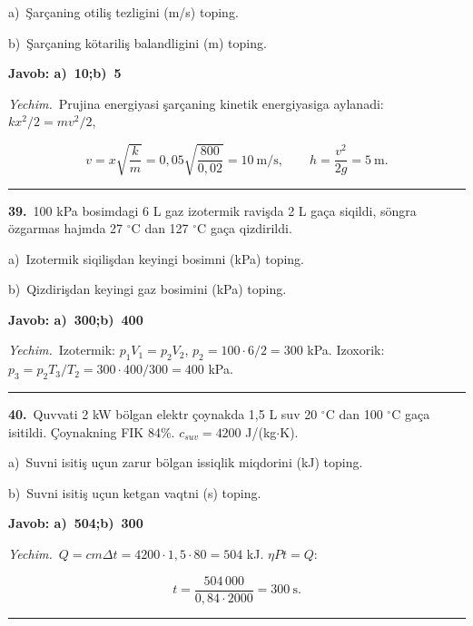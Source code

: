\documentclass[11pt,a4paper]{article}
\begin{document}
\noindent\hspace*{4mm}a)\ Şarçaning otiliş tezligini (m/s) toping.\par
\noindent\hspace*{4mm}b)\ Şarçaning kötariliş balandligini (m) toping.\par
\noindent\colorbox{gray!12}{\parbox{\dimexpr\linewidth-2\fboxsep}{\textbf{Javob: a)\ 10;\quad b)\ 5}}}\par\smallskip
\noindent\textit{Yechim.}\ Prujina energiyasi şarçaning kinetik energiyasiga aylanadi: $kx^2/2=mv^2/2$,\par
\[v=x\sqrt{\frac{k}{m}}=0{,}05\sqrt{\frac{800}{0{,}02}}=10\ \text{m/s},\qquad h=\frac{v^2}{2g}=5\ \text{m}.\]\par\medskip\hrule\medskip
{}\noindent\textbf{39.}\ 100 kPa bosimdagi 6 L gaz izotermik ravişda 2 L gaça siqildi, söngra özgarmas hajmda 27 $^\circ$C dan 127 $^\circ$C gaça qizdirildi.\par
\noindent\hspace*{4mm}a)\ Izotermik siqilişdan keyingi bosimni (kPa) toping.\par
\noindent\hspace*{4mm}b)\ Qizdirişdan keyingi gaz bosimini (kPa) toping.\par
\noindent\colorbox{gray!12}{\parbox{\dimexpr\linewidth-2\fboxsep}{\textbf{Javob: a)\ 300;\quad b)\ 400}}}\par\smallskip
\noindent\textit{Yechim.}\ Izotermik: $p_1V_1=p_2V_2$, $p_2=100\cdot6/2=300$ kPa. Izoxorik: $p_3=p_2T_3/T_2=300\cdot400/300=400$ kPa.\par\par\medskip\hrule\medskip
{}\noindent\textbf{40.}\ Quvvati 2 kW bölgan elektr çoynakda 1,5 L suv 20 $^\circ$C dan 100 $^\circ$C gaça isitildi. Çoynakning FIK 84\%. $c_{suv}=4200$ J/(kg$\cdot$K).\par
\noindent\hspace*{4mm}a)\ Suvni isitiş uçun zarur bölgan issiqlik miqdorini (kJ) toping.\par
\noindent\hspace*{4mm}b)\ Suvni isitiş uçun ketgan vaqtni (s) toping.\par
\noindent\colorbox{gray!12}{\parbox{\dimexpr\linewidth-2\fboxsep}{\textbf{Javob: a)\ 504;\quad b)\ 300}}}\par\smallskip
\noindent\textit{Yechim.}\ $Q=cm\Delta t=4200\cdot1{,}5\cdot80=504$ kJ. $\eta Pt=Q$:\par
\[t=\frac{504\,000}{0{,}84\cdot2000}=300\ \text{s}.\]\par\medskip\hrule\medskip
\end{document}
